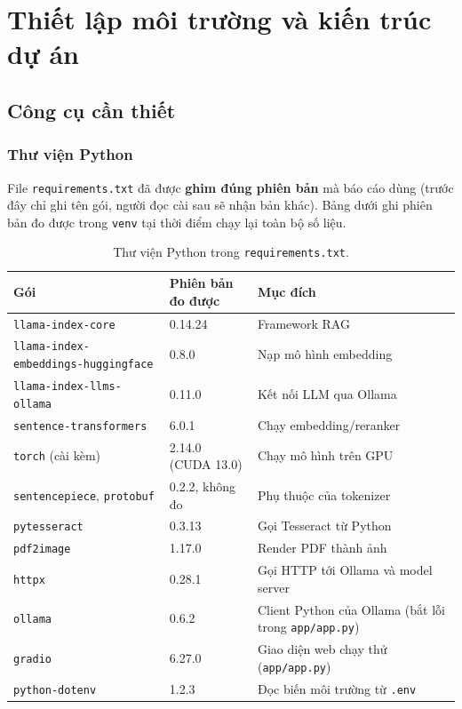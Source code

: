 \chapter{Thiết lập môi trường và kiến trúc dự án}
\label{ch:moi-truong}


\section{Công cụ cần thiết}

\subsection{Thư viện Python}

File \texttt{requirements.txt} đã được \textbf{ghim đúng phiên bản} mà báo cáo dùng (trước đây chỉ ghi tên gói, người đọc cài sau sẽ nhận bản khác). Bảng dưới ghi phiên bản đo được trong \texttt{venv} tại thời điểm chạy lại toàn bộ số liệu.

\begin{table}[H]
  \centering
  \small
  \begin{tabularx}{\textwidth}{>{\hsize=1.5\hsize}X l >{\hsize=0.5\hsize}X}
    \toprule
    \textbf{Gói} & \textbf{Phiên bản đo được} & \textbf{Mục đích} \\
    \midrule
    \texttt{llama-index-core} & 0.14.24 & Framework RAG \\
    \texttt{llama-index-embeddings-huggingface} & 0.8.0 & Nạp mô hình embedding \\
    \texttt{llama-index-llms-ollama} & 0.11.0 & Kết nối LLM qua Ollama \\
    \texttt{sentence-transformers} & 6.0.1 & Chạy embedding/reranker \\
    \texttt{torch} (cài kèm) & 2.14.0 (CUDA 13.0) & Chạy mô hình trên GPU \\
    \texttt{sentencepiece}, \texttt{protobuf} & 0.2.2, không đo & Phụ thuộc của tokenizer \\
    \texttt{pytesseract} & 0.3.13 & Gọi Tesseract từ Python \\
    \texttt{pdf2image} & 1.17.0 & Render PDF thành ảnh \\
    \texttt{httpx} & 0.28.1 & Gọi HTTP tới Ollama và model server \\
    \texttt{ollama} & 0.6.2 & Client Python của Ollama (bắt lỗi trong \texttt{app/app.py}) \\
    \texttt{gradio} & 6.27.0 & Giao diện web chạy thử (\texttt{app/app.py}) \\
    \texttt{python-dotenv} & 1.2.3 & Đọc biến môi trường từ \texttt{.env} \\
    \bottomrule
  \end{tabularx}
  \caption{Thư viện Python trong \texttt{requirements.txt}.}
\end{table}


